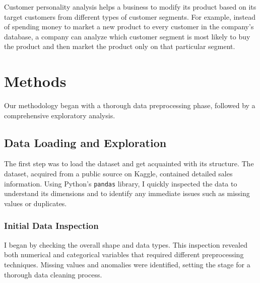 \documentclass[a4paper]{article}
\begin{document}
\begin{multicols}{2}
Customer personality analysis helps a business to modify its product based on its target customers from different types of customer segments. For example, instead of spending money to market a new product to every customer in the company’s database, a company can analyze which customer segment is most likely to buy the product and then market the product only on that particular segment.


\section{Methods}
Our methodology began with a thorough data preprocessing phase, followed by a comprehensive exploratory analysis. 

\subsection{Data Loading and Exploration}
The first step was to load the dataset and get acquainted with its structure. The dataset, acquired from a public source on Kaggle, contained detailed sales information. Using Python's \texttt{pandas} library, I quickly inspected the data to understand its dimensions and to identify any immediate issues such as missing values or duplicates.

\subsubsection{Initial Data Inspection}
I began by checking the overall shape and data types. This inspection revealed both numerical and categorical variables that required different preprocessing techniques. Missing values and anomalies were identified, setting the stage for a thorough data cleaning process.

\end{multicols} 
\end{document}
